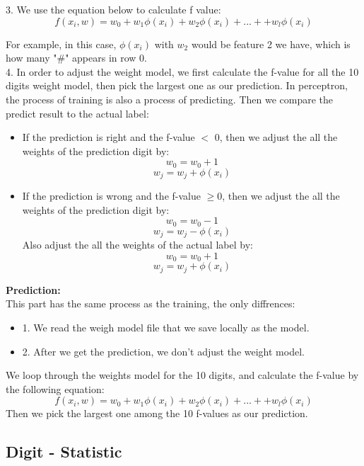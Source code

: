 \documentclass[11pt]{report}
\begin{document}
3. We use the equation below to calculate f value:
$$f(x_i, w) = w_0 + w_1\phi(x_i)+ w_2\phi(x_i) + ... + + w_l\phi(x_i)$$

For example, in this case, $\phi(x_i)$ with $w_2$ would be feature 2 we have, which is how many "\#" appears in row 0. \\


4. In order to adjust the weight model, we first calculate the f-value for all the 10 digits weight model, then pick the largest one as our prediction. In perceptron, the process of training is also a process of predicting. Then we compare the predict result to the actual label:
 \begin{itemize}
\item If the prediction is right and the f-value $<$ 0, then we adjust the all the weights of the prediction digit by:
$$w_0 = w_0 + 1$$
$$w_j = w_j + \phi(x_i)$$
\item If the prediction is wrong and the f-value $\geq 0$, then we adjust the all the weights of the prediction digit by:
$$w_0 = w_0 - 1$$
$$w_j = w_j - \phi(x_i)$$
Also adjust the all the weights of the actual label by:
$$w_0 = w_0 + 1$$
$$w_j = w_j + \phi(x_i)$$
\end{itemize}


\noindent \textbf{Prediction:} \\

This part has the same process as the training, the only diffrences: 
\begin{itemize}
\item 1.  We read the weigh model file that we save locally as the model. 
\item 2. After we get the prediction, we don't adjust the weight model.
\end{itemize}

We loop through the weights model for the 10 digits, and calculate the f-value by the following equation:
$$f(x_i, w) = w_0 + w_1\phi(x_i)+ w_2\phi(x_i) + ... + + w_l\phi(x_i)$$
Then we pick the largest one among the 10 f-values as our prediction.

\newpage
\subsection*{Digit - Statistic}
\end{document}

